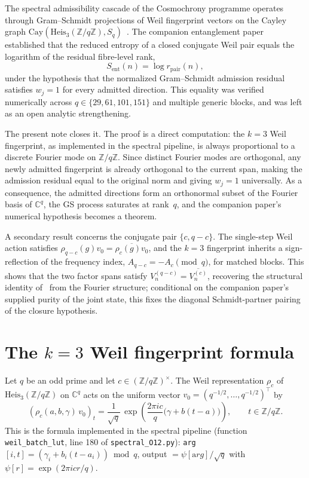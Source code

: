 \documentclass[11pt]{article}
\newcommand{\Heis}{\mathrm{Heis}}
\newcommand{\Cay}{\mathrm{Cay}}
\newcommand{\Sent}{S_{\mathrm{ent}}}
\newcommand{\rpair}{r_{\mathrm{pair}}}
\begin{document}
    The spectral admissibility cascade of the Cosmochrony programme operates through
    Gram--Schmidt projections of Weil fingerprint vectors on the Cayley graph
    $\Cay(\Heis_3(\mathbb{Z}/q\mathbb{Z}),S_q)$~\cite{Beau2026a15,Beau2026a16}.
    The companion entanglement paper~\cite{Beau2026entnote} established that the reduced entropy
    of a closed conjugate Weil pair equals the logarithm of the residual fibre-level rank,
    \[
      \Sent(n) = \log \rpair(n),
    \]
    under the hypothesis that the normalized Gram--Schmidt admission residual satisfies
    $w_j=1$ for every admitted direction.
    This equality was verified numerically across $q\in\{29,61,101,151\}$ and multiple
    generic blocks, and was left as an open analytic strengthening.

    The present note closes it.
    The proof is a direct computation: the $k{=}3$ Weil fingerprint,
    as implemented in the spectral pipeline, is always proportional to a discrete Fourier
    mode on $\mathbb{Z}/q\mathbb{Z}$.
    Since distinct Fourier modes are orthogonal, any newly admitted fingerprint is
    already orthogonal to the current span, making the admission residual equal to the
    original norm and giving $w_j=1$ universally.
    As a consequence, the admitted directions form an orthonormal subset of the Fourier
    basis of $\mathbb{C}^q$, the GS process saturates at rank~$q$, and the companion
    paper's numerical hypothesis becomes a theorem.

    A secondary result concerns the conjugate pair $\{c,q-c\}$.
    The single-step Weil action satisfies $\rho_{q-c}(g)v_0 = \overline{\rho_c(g)v_0}$,
    and the $k{=}3$ fingerprint inherits a sign-reflection of the frequency index,
    $A_{q-c} = -A_c \pmod{q}$, for matched blocks.
    This shows that the two factor spans satisfy $V^{(q-c)}_n = \overline{V^{(c)}_n}$,
    recovering the structural identity of~\cite{Beau2026a21} from the Fourier structure;
    conditional on the companion paper's supplied purity of the joint state, this fixes the
    diagonal Schmidt-partner pairing of the closure hypothesis.

  \section{The \texorpdfstring{$k{=}3$}{k=3} Weil fingerprint formula}
    \label{sec:formula}

    Let $q$ be an odd prime and let $c\in(\mathbb{Z}/q\mathbb{Z})^\times$.
    The Weil representation $\rho_c$ of $\Heis_3(\mathbb{Z}/q\mathbb{Z})$ on $\mathbb{C}^q$
    acts on the uniform vector $v_0=(q^{-1/2},\dots,q^{-1/2})^\top$ by
    \begin{equation}
      \label{eq:weil}
      (\rho_c(a,b,\gamma)\,v_0)_t
      =
      \frac{1}{\sqrt{q}}\,\exp\!\left(\frac{2\pi ic}{q}\bigl(\gamma+b(t-a)\bigr)\right),
      \qquad t\in\mathbb{Z}/q\mathbb{Z}.
    \end{equation}
    This is the formula implemented in the spectral pipeline (function
    \texttt{weil\_batch\_lut}, line 180 of \texttt{spectral\_O12.py}):
    \texttt{arg}$[i,t]=(\gamma_i+b_i(t-a_i))\bmod q$, output $= \psi[{\mathrm arg}]/\sqrt{q}$
    with $\psi[r]=\exp(2\pi icr/q)$.
\end{document}
